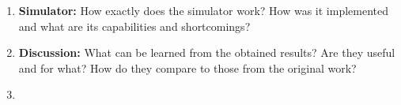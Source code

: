 \documentclass[../review.tex]{subfiles}
\begin{document}
\begin{enumerate}
 \item \textbf{Simulator:} How exactly does the simulator work? How was it implemented and what are its capabilities and shortcomings?
 \item \textbf{Discussion:} What can be learned from the obtained results? Are they useful and for what? How do they compare to those from the original work?
 \item \textbf{}
\end{enumerate}
\end{document}

